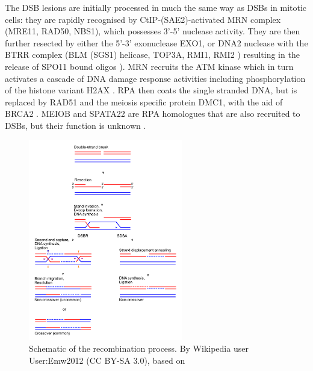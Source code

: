 The DSB lesions are initially processed in much the same way as DSBs in mitotic cells: they are rapidly recognised by CtIP-(SAE2)-activated MRN complex (MRE11, RAD50, NBS1), which possesses 3'-5' nuclease activity. They are then further resected by either the 5'-3' exonuclease EXO1, or DNA2 nuclease with the BTRR complex (BLM (SGS1) helicase, TOP3A, RMI1, RMI2 \parencite{Daley2014Multifaceted}) resulting in the release of SPO11 bound oligos \parencite[Reviewed in][]{Symington2014End, Schiller2014Structural, Lam2015Mechanism}). MRN recruits the ATM kinase which in turn activates a cascade of DNA damage response activities including phosphorylation of the histone variant H2AX \parencite{Marechal2013DNA}. RPA then coats the single stranded DNA, but is replaced by RAD51 and the meiosis specific protein DMC1, with the aid of BRCA2 \parencite{Liu2010Human, Jensen2010Purified, Shi2019Dual}. MEIOB and SPATA22 are RPA homologues that are also recruited to DSBs, but their function is unknown \parencite{Xu2017Meiosisspecific}.


\begin{figure}[H]
	\centering
	\includegraphics[width=0.6\textwidth]{figures/intro/recombination.pdf}
	\caption[Molecular Recombination]{Schematic of the recombination process. By Wikipedia user User:Emw2012 (CC BY-SA 3.0), based on \cite{Sung2006Mechanism}}
	\label{fig:molecular_recombination}
\end{figure}

